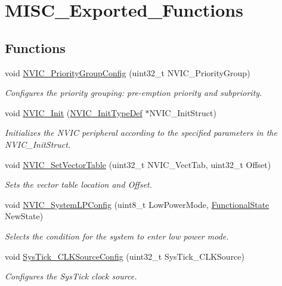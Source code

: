 \hypertarget{group___m_i_s_c___exported___functions}{}\section{M\+I\+S\+C\+\_\+\+Exported\+\_\+\+Functions}
\label{group___m_i_s_c___exported___functions}
\subsection*{Functions}
\begin{DoxyCompactItemize}
\item 
void \mbox{\hyperlink{group___m_i_s_c___exported___functions_gadfb1f34f803ce54c976643db8c484442}{N\+V\+I\+C\+\_\+\+Priority\+Group\+Config}} (uint32\+\_\+t N\+V\+I\+C\+\_\+\+Priority\+Group)
\begin{DoxyCompactList}\small\item\em Configures the priority grouping\+: pre-\/emption priority and subpriority. \end{DoxyCompactList}\item 
void \mbox{\hyperlink{group___m_i_s_c___exported___functions_ga4ab373ed0870c06fca5eb51d639adf41}{N\+V\+I\+C\+\_\+\+Init}} (\mbox{\hyperlink{struct_n_v_i_c___init_type_def}{N\+V\+I\+C\+\_\+\+Init\+Type\+Def}} $\ast$N\+V\+I\+C\+\_\+\+Init\+Struct)
\begin{DoxyCompactList}\small\item\em Initializes the N\+V\+IC peripheral according to the specified parameters in the N\+V\+I\+C\+\_\+\+Init\+Struct. \end{DoxyCompactList}\item 
void \mbox{\hyperlink{group___m_i_s_c___exported___functions_ga1145208ad70edfc2fab19b8b8ef1b1a1}{N\+V\+I\+C\+\_\+\+Set\+Vector\+Table}} (uint32\+\_\+t N\+V\+I\+C\+\_\+\+Vect\+Tab, uint32\+\_\+t Offset)
\begin{DoxyCompactList}\small\item\em Sets the vector table location and Offset. \end{DoxyCompactList}\item 
void \mbox{\hyperlink{group___m_i_s_c___exported___functions_gae21011c5232f5b8f366acbecd12a1d4a}{N\+V\+I\+C\+\_\+\+System\+L\+P\+Config}} (uint8\+\_\+t Low\+Power\+Mode, \mbox{\hyperlink{group___exported__types_gac9a7e9a35d2513ec15c3b537aaa4fba1}{Functional\+State}} New\+State)
\begin{DoxyCompactList}\small\item\em Selects the condition for the system to enter low power mode. \end{DoxyCompactList}\item 
void \mbox{\hyperlink{group___m_i_s_c___exported___functions_ga2777d255bb06ad62bb6372a9db1ff385}{Sys\+Tick\+\_\+\+C\+L\+K\+Source\+Config}} (uint32\+\_\+t Sys\+Tick\+\_\+\+C\+L\+K\+Source)
\begin{DoxyCompactList}\small\item\em Configures the Sys\+Tick clock source. \end{DoxyCompactList}\end{DoxyCompactItemize}


